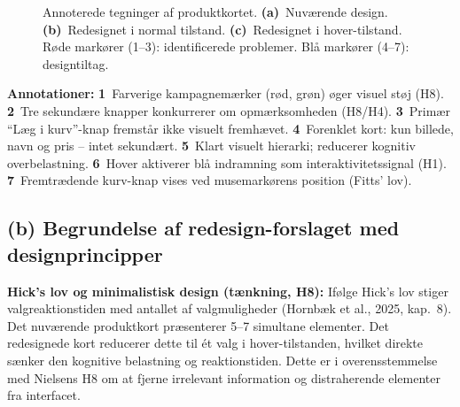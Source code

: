 \documentclass[12pt,a4paper]{article}
\begin{document}
\begin{figure}[h!]
%
\caption{Annoterede tegninger af produktkortet. \textbf{(a)}~Nuværende design.
\textbf{(b)}~Redesignet i normal tilstand. \textbf{(c)}~Redesignet i hover-tilstand.
Røde markører (1--3): identificerede problemer. Blå markører (4--7): designtiltag.}
\label{fig:prototyper}
\end{figure}

\noindent\textbf{Annotationer:}
\textbf{1}~Farverige kampagnemærker (rød, grøn) øger visuel støj (H8).
\textbf{2}~Tre sekundære knapper konkurrerer om opmærksomheden (H8/H4).
\textbf{3}~Primær ``Læg i kurv''-knap fremstår ikke visuelt fremhævet.
\textbf{4}~Forenklet kort: kun billede, navn og pris -- intet sekundært.
\textbf{5}~Klart visuelt hierarki; reducerer kognitiv overbelastning.
\textbf{6}~Hover aktiverer blå indramning som interaktivitetssignal (H1).
\textbf{7}~Fremtrædende kurv-knap vises ved musemarkørens position (Fitts' lov).

\subsection*{(b) Begrundelse af redesign-forslaget med designprincipper}

\textbf{Hick's lov og minimalistisk design (tænkning, H8):}
Ifølge Hick's lov stiger valgreaktionstiden med antallet af valgmuligheder
(Hornbæk et al., 2025, kap.\ 8). Det nuværende produktkort præsenterer 5--7 simultane
elementer. Det redesignede kort reducerer dette til ét valg i hover-tilstanden, hvilket
direkte sænker den kognitive belastning og reaktionstiden. Dette er i overensstemmelse med
Nielsens H8 om at fjerne irrelevant information og distraherende elementer fra interfacet.
\end{document}
